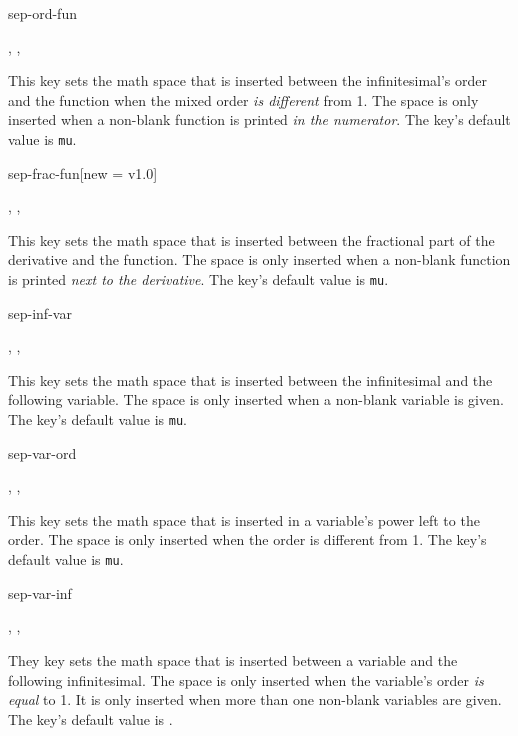 	\clearpage
	
	\begin{option}{sep-ord-fun}
		\begin{values}[default = 0]
			, , 
		\end{values}
		This key sets the math space that is inserted between the infinitesimal's order and the function when the mixed order \emph{is different} from \num{1}. The space is only inserted when a non-blank function is printed \emph{in the numerator}. The key's default value is  \texttt{mu}.
	\end{option}
	
	\begin{option}{sep-frac-fun}[new = v1.0]
		\begin{values}[default = 0]
			, , 
		\end{values}
		This key sets the math space that is inserted between the fractional part of the derivative and the function. The space is only inserted when a non-blank function is printed \emph{next to the derivative}. The key's default value is  \texttt{mu}.
	\end{option}
	
	\begin{option}{sep-inf-var}
		\begin{values}[default = 0]
			, , 
		\end{values}
		This key sets the math space that is inserted between the infinitesimal and the following variable. The space is only inserted when a non-blank variable is given. The key's default value is  \texttt{mu}.
	\end{option}
	
	\begin{option}{sep-var-ord}
		\begin{values}[default = 0]
			, , 
		\end{values}
		This key sets the math space that is inserted in a variable's power left to the order. The space is only inserted when the order is different from \num{1}. The key's default value is  \texttt{mu}.
	\end{option}
	
	\begin{option}{sep-var-inf}
		\begin{values}[default = \cs{mathop}\{\}\cs{!}]
			, , 
		\end{values}
		They key sets the math space that is inserted between a variable and the following infinitesimal. The space is only inserted when the variable's order \emph{is equal} to \num{1}. It is only inserted when more than one non-blank variables are given. The key's default value is .
	\end{option}
	
